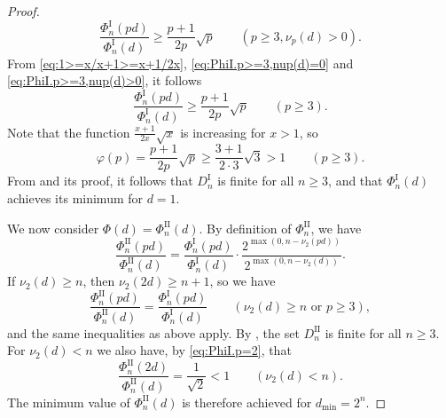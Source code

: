 \documentclass[a4paper]{amsart}
\theoremstyle{definition}
\theoremstyle{plain}
\newcommand{\I}{\mathrm{I}}
\newcommand{\II}{\mathrm{II}}
\begin{document}
\begin{proof}
\begin{equation}
        \frac{\Phi_n^\I(pd)}{\Phi_n^\I(d)} \geq \frac{p+1}{2p} \sqrt{p} \qquad (p \geq 3, \nu_p(d) > 0).
    \end{equation}
    From \eqref{eq:1>=x/x+1>=x+1/2x}, \eqref{eq:PhiI.p>=3,nup(d)=0} and \eqref{eq:PhiI.p>=3,nup(d)>0}, it follows
    \begin{equation*} \label{eq:PhiI.p>=3}
        \frac{\Phi_n^\I(pd)}{\Phi_n^\I(d)} \geq \frac{p+1}{2p} \sqrt{p} \qquad (p \geq 3).
    \end{equation*}
    Note that the function \(\frac{x+1}{2x}\sqrt{x}\) is increasing for \(x>1\), so 
    \[
        \varphi(p) = \frac{p+1}{2p} \sqrt{p} \geq \frac{3+1}{2\cdot 3} \sqrt{3} > 1 \qquad (p\geq 3).
    \]
    From  and its proof, it follows that \(D_n^\I\) is finite for all \(n \geq 3\), and that \(\Phi_n^\I(d)\) achieves its minimum for \(d = 1\).

    We now consider \(\Phi(d)= \Phi_n^\II(d)\). By definition of \(\Phi_n^\II\), we have  
    \[
        \frac{\Phi_n^\II(pd)}{\Phi_n^\II(d)} = \frac{\Phi_n^\I(pd)}{\Phi_n^\I(d)} \cdot \frac{2^{\max(0, n - \nu_2(pd))}}{2^{\max(0, n - \nu_2(d))}}.
    \]  
    If \(\nu_2(d) \geq n\), then \(\nu_2(2d) \geq n+1\), so we have  
    \[
    \frac{\Phi_n^\II(pd)}{\Phi_n^\II(d)} = \frac{\Phi_n^\I(pd)}{\Phi_n^\I(d)} \qquad (\nu_2(d)\geq n \mbox{ or } p\geq 3),
    \]  
    and the same inequalities as above apply. By , the set \(D_n^\II\) is finite for all \(n \geq 3\).
    For \(\nu_2(d) < n\) we also have, by \eqref{eq:PhiI.p=2}, that
    \[
    \frac{\Phi_n^\II(2d)}{\Phi_n^\II(d)} = 
    \frac{1}{\sqrt{2}} <1 \qquad (\nu_2(d) <n).
    \] 
    The minimum value of \(\Phi_n^\II(d)\) is therefore achieved for \(d_{\min} = 2^n\).


\end{proof}
\end{document}
